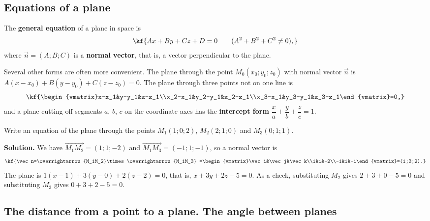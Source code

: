 
\subsection{Equations of a plane}

\begin{tarif}
The \textbf{general equation} of a plane in space is
\[\kf{Ax+By+Cz+D=0\qquad(A^2+B^2+C^2\neq0),}\]
where $\vec n=(A;B;C)$ is a \textbf{normal vector}, that is, a vector
perpendicular to the plane.
\end{tarif}

Several other forms are often more convenient. The plane through the point
$M_0(x_0;y_0;z_0)$ with normal vector $\vec n$ is
$A(x-x_0)+B(y-y_0)+C(z-z_0)=0$. The plane through three points not on one line
is
\[\kf{\begin{vmatrix}x-x_1&y-y_1&z-z_1\\x_2-x_1&y_2-y_1&z_2-z_1\\x_3-x_1&y_3-y_1&z_3-z_1\end{vmatrix}=0,}\]
and a plane cutting off segments $a$, $b$, $c$ on the coordinate axes has the
\textbf{intercept form} $\dfrac{x}{a}+\dfrac{y}{b}+\dfrac{z}{c}=1$.

\begin{misol}
Write an equation of the plane through the points $M_1(1;0;2)$, $M_2(2;1;0)$
and $M_3(0;1;1)$.

\textbf{Solution.} We have $\overrightarrow{M_1M_2}=(1;1;-2)$ and
$\overrightarrow{M_1M_3}=(-1;1;-1)$, so a normal vector is
\[\kf{\vec n=\overrightarrow{M_1M_2}\times\overrightarrow{M_1M_3}
=\begin{vmatrix}\vec i&\vec j&\vec k\\1&1&-2\\-1&1&-1\end{vmatrix}=(1;3;2).}\]
The plane is $1(x-1)+3(y-0)+2(z-2)=0$, that is, $x+3y+2z-5=0$.
As a check, substituting $M_2$ gives $2+3+0-5=0$ and substituting $M_3$ gives
$0+3+2-5=0$.
\end{misol}

\subsection{The distance from a point to a plane. The angle between planes}

